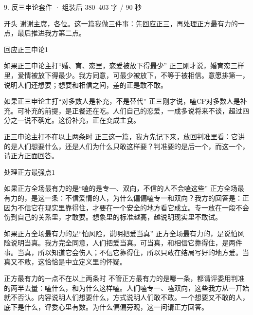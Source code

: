 \documentclass[script,con]{debate}
\begin{document}
\begin{kit}{9. 反三申论}{套件 · 组装后 380–403 字 / 90 秒}
\begin{fixed}{开头}
谢谢主席，各位。这一篇我做三件事：先回应正三，再处理正方最有力的一点，最后推进我方第二点。
\end{fixed}
\begin{pick}{回应正三申论}{1}
\begin{module}{如果正三申论主打“婚、育、恋里，恋爱被放下得最少”}
正三刚才说，婚育恋三样里，爱情被放下得最少。我方同意，可最少被放下，不等于被相信。意愿排第一，说明人们还想要；想要和相信之间，差的正是敢不敢。
\end{module}
\begin{module}{如果正三申论主打“对多数人是补充，不是替代”}
正三刚才说，嗑CP对多数人是补充。可补充的前提，是正餐还在吃。人们自己的恋爱，一成多说将来不谈，超过四分之一说不确定。这份补充，正在变成主食。
\end{module}
\begin{fallback}{正三申论主打不在以上两条时}
正三这一篇，我方先记下来，放回判准里看：它讲的是人们想要什么，还是人们为什么只敢这样要？判准要的是后一个，而这一个，请正方正面回答。
\end{fallback}
\end{pick}
\begin{pick}{处理正方最强点}{1}
\begin{module}{如果正方全场最有力的是“嗑的是专一、双向，不信的人不会嗑这些”}
正方全场最有力的，是这一条：不信爱情的人，为什么偏偏嗑专一和双向？我方的回答是：正因为不信它在现实里靠得住，才要在一个安全的地方看它成立。专一放在一段不会伤到自己的关系里，才敢要。想象里的标准越高，越说明现实里不敢试。
\end{module}
\begin{module}{如果正方全场最有力的是“怕风险，说明把爱当真”}
正方全场最有力的，是说怕风险说明当真。我方完全同意，人们把爱当真。可当真，和相信它靠得住，是两件事。当真，所以知道它会伤人；不信它靠得住，所以只敢在结局写好的地方爱。当真又不敢，这恰恰是中立定义里的怀疑。
\end{module}
\begin{fallback}{正方最有力的一点不在以上两条时}
不管正方最有力的是哪一条，都请评委用判准的两半去量：嗑什么，和为什么这样嗑。人们嗑专一、嗑双向，这些我方从一开始就不否认。内容说明人们想要什么，方式说明人们敢不敢。一个想要又不敢的人，底下是什么，评委心里有数。为什么偏偏旁观，这一问请正方回答。
\end{fallback}
\end{pick}

\end{kit}
\end{document}
